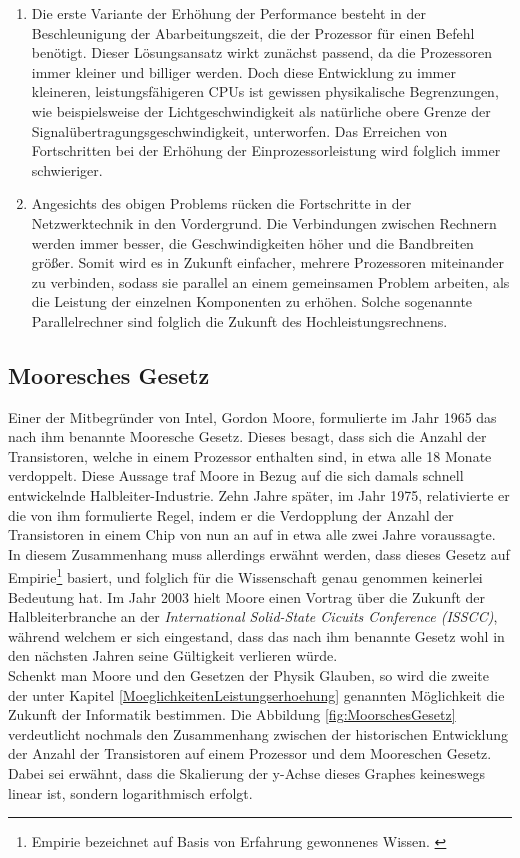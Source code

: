 			\begin{enumerate}
				\item Die erste Variante der Erhöhung der Performance besteht in der Beschleunigung der Abarbeitungszeit, die der Prozessor für einen Befehl benötigt. Dieser Lösungsansatz wirkt zunächst passend, da die Prozessoren immer kleiner und billiger werden. Doch diese Entwicklung zu immer kleineren, leistungsfähigeren CPUs ist gewissen physikalische Begrenzungen, wie beispielsweise der Lichtgeschwindigkeit als natürliche obere Grenze der Signalübertragungsgeschwindigkeit, unterworfen. Das Erreichen von Fortschritten bei der Erhöhung der Einprozessorleistung wird folglich immer schwieriger. \cite{GrundlagenParallelisierung}
				\item Angesichts des obigen Problems rücken die Fortschritte in der Netzwerktechnik in den Vordergrund. Die Verbindungen zwischen Rechnern werden immer besser, die Geschwindigkeiten höher und die Bandbreiten größer. Somit wird es in Zukunft einfacher, mehrere Prozessoren miteinander zu verbinden, sodass sie parallel an einem gemeinsamen Problem arbeiten, als die Leistung der einzelnen Komponenten zu erhöhen. \cite{GrundlagenParallelisierung} Solche sogenannte Parallelrechner sind folglich die Zukunft des Hochleistungsrechnens.
			\end{enumerate}

		\subsection{Mooresches Gesetz}
		
			Einer der Mitbegründer von Intel, Gordon Moore, formulierte im Jahr 1965 das nach ihm benannte Mooresche Gesetz. Dieses besagt, dass sich die Anzahl der Transistoren, welche in einem Prozessor enthalten sind, in etwa alle 18 Monate verdoppelt. Diese Aussage traf Moore in Bezug auf die sich damals schnell entwickelnde Halbleiter-Industrie. Zehn Jahre später, im Jahr 1975, relativierte er die von ihm formulierte Regel, indem er die Verdopplung der Anzahl der Transistoren in einem Chip von nun an auf in etwa alle zwei Jahre voraussagte. In diesem Zusammenhang muss allerdings erwähnt werden, dass dieses Gesetz auf Empirie\footnote{Empirie bezeichnet auf Basis von Erfahrung gewonnenes Wissen. \cite{EmpirieDuden}} basiert, und folglich für die Wissenschaft genau genommen keinerlei Bedeutung hat.
			Im Jahr 2003 hielt Moore einen Vortrag über die Zukunft der Halbleiterbranche an der \textit{International Solid-State Cicuits Conference (ISSCC)}, während welchem er sich eingestand, dass das nach ihm benannte Gesetz wohl in den nächsten Jahren seine Gültigkeit verlieren würde. \cite{EndeHardwareMiniaturisierung}\\
			Schenkt man Moore und den Gesetzen der Physik Glauben, so wird die zweite der unter Kapitel  \ref{MoeglichkeitenLeistungserhoehung} genannten Möglichkeit die Zukunft der Informatik bestimmen.
			Die Abbildung \ref{fig:MoorschesGesetz} verdeutlicht nochmals den Zusammenhang zwischen der historischen Entwicklung der Anzahl der Transistoren auf einem Prozessor und dem Mooreschen Gesetz. Dabei sei erwähnt, dass die Skalierung der y-Achse dieses Graphes keineswegs linear ist, sondern logarithmisch erfolgt.
		

